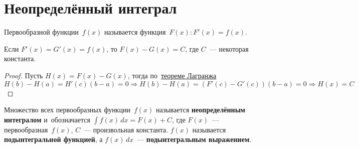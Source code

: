 \section{Неопределённый интеграл}
 Первообразной функции~$f(x)$ называется функция~$F(x) \colon F'(x) = f(x)$.

\begin{theorem}
Если $F'(x) = G'(x) = f(x)$, то $F(x) - G(x) = C$, где $C$~--- некоторая константа.
\end{theorem}
\begin{proof}
Пусть $H(x) = F(x) - G(x)$, тогда по~\hyperref[th:mean_value]{теореме Лагранжа}
\begin{equation*}
H(b) - H(a) = H'(c)(b - a) = 0 \Rightarrow
H(b) - H(a) = (F'(c) - G'(c))(b - a) = 0 \Rightarrow
H(x) = C
\end{equation*}
\end{proof}

 Множество всех первообразных функции~$f(x)$ называется \textbf{неопределённым интегралом} и~обозначается $\int f(x)\,dx = F(x) + C$, где $F(x)$~--- первообразная~$f(x)$, $C$~--- произвольная константа.
$f(x)$ называется \textbf{подынтегральной функцией}, а $f(x)\,dx$~--- \textbf{подынтегральным выражением}.